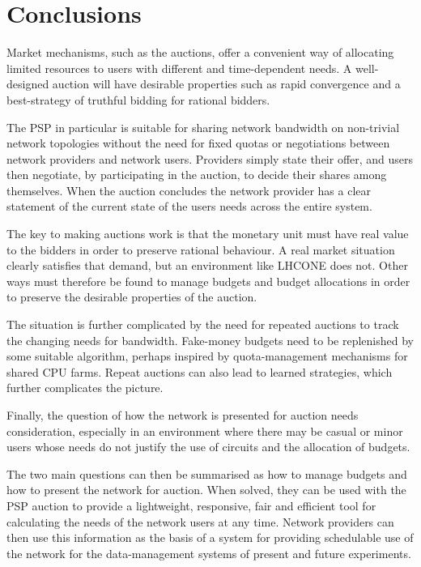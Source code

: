 \section{Conclusions}

Market mechanisms, such as the auctions, offer a convenient way of allocating limited resources to users with different and time-dependent needs. A well-designed auction will have desirable properties such as rapid convergence and a best-strategy of truthful bidding for rational bidders.

The PSP in particular is suitable for sharing network bandwidth on non-trivial network topologies without the need for fixed quotas or negotiations between network providers and network users. Providers simply state their offer, and users then negotiate, by participating in the auction, to decide their shares among themselves. When the auction concludes the network provider has a clear statement of the current state of the users needs across the entire system.

The key to making auctions work is that the monetary unit must have real value to the bidders in order to preserve rational behaviour. A real market situation clearly satisfies that demand, but an environment like LHCONE does not. Other ways must therefore be found to manage budgets and budget allocations in order to preserve the desirable properties of the auction.

The situation is further complicated by the need for repeated auctions to track the changing needs for bandwidth. Fake-money budgets need to be replenished by some suitable algorithm, perhaps inspired by quota-management mechanisms for shared CPU farms. Repeat auctions can also lead to learned strategies, which further complicates the picture.

Finally, the question of how the network is presented for auction needs consideration, especially in an environment where there may be casual or minor users whose needs do not justify the use of circuits and the allocation of budgets.

The two main questions can then be summarised as how to manage budgets and how to present the network for auction. When solved, they can be used with the PSP auction to provide a lightweight, responsive, fair and efficient tool for calculating the needs of the network users at any time. Network providers can then use this information as the basis of a system for providing schedulable use of the network for the data-management systems of present and future experiments.
